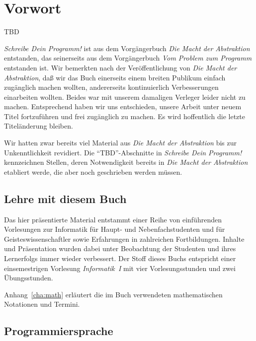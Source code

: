 
\chapter*{Vorwort}
\thispagestyle{empty}


TBD

\textit{Schreibe Dein Programm!} ist aus dem Vorgängerbuch \textit{Die
  Macht der Abstraktion} entstanden, das seinerseits aus dem
Vorgängerbuch \textit{Vom Problem zum Programm} entstanden ist.  Wir
bemerkten nach der Veröffentlichung von \textit{Die Macht der
  Abstraktion}, daß wir das Buch einerseits einem breiten Publikum
einfach zugänglich machen wollten, andererseits kontinuierlich
Verbesserungen einarbeiten wollten.  Beides war mit unserem damaligen
Verleger leider nicht zu machen.  Entsprechend haben wir uns
entschieden, unsere Arbeit unter neuem Titel fortzuführen und frei
zugänglich zu machen.  Es wird hoffentlich die letzte Titeländerung
bleiben.

Wir hatten zwar bereits viel Material aus \textit{Die Macht der
  Abstraktion} bis zur Unkenntlichkeit revidiert.  Die
"`TBD"'-Abschnitte in \textit{Schreibe Dein Programm!} kennzeichnen
Stellen, deren Notwendigkeit bereits in \textit{Die Macht der
  Abstraktion} etabliert werde, die aber noch geschrieben werden
müssen.

\section*{Lehre mit diesem Buch}

Das hier präsentierte Material entstammt einer Reihe von einführenden
Vorlesungen zur Informatik für Haupt- und Nebenfachstudenten und für
Geisteswissenschaftler sowie Erfahrungen in zahlreichen Fortbildungen.
Inhalte und Präsentation wurden dabei unter
Beobachtung der Studenten und ihres Lern\-er\-folgs immer wieder
verbessert.  Der Stoff dieses Buchs entspricht einer einsemestrigen
Vorlesung \textit{Informatik~I} mit vier Vorlesungsstunden und zwei
Übungsstunden.

Anhang~\ref{cha:math} erläutert die im Buch verwendeten mathematischen
Notationen und Termini.

\section*{Programmiersprache}

